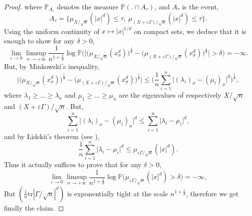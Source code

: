 \documentclass[aop,preprint]{imsart}
\newcommand\PP{\mathbb{P}}
\newcommand\tr{\mathrm{tr}}
\newcommand\eps{\varepsilon}
\numberwithin{equation}{section}
\theoremstyle{definition}
\theoremstyle{plain}
\theoremstyle{remark}
\begin{document}
\begin{proof}
where $\PP_{A_\tau}$ denotes the measure $\PP( . \cap A_\tau)$, and $A_\tau$ is the event,
$$ A_\tau = \big\{ \mu_{X/\sqrt{n}}(|x|^d) \leq \tau, \ \mu_{(X+\eps \Gamma)/\sqrt{n}}(|x|^d) \leq \tau \big\}.$$
Using the uniform continuity of $x\mapsto |x|^{1/d}$ on compact sets, we deduce that it is enough to show for any $\delta>0$,
$$ \lim_{\eps \to 0 } \limsup_{n\to +\infty} \frac{1}{n^{1+\frac{2}{d}}} \log \PP\big( \big|\big(\mu_{X/\sqrt{n}}(x^d_\sigma)\big)^{\frac{1}{d}}- \big(\mu_{(X+\eps \Gamma)/\sqrt{n}}(x^d_\sigma)\big)^{\frac{1}{d}}\big|>\delta \big) = - \infty.$$
But, by Minkowski's inequality, 
$$ \big|\big(\mu_{X/\sqrt{n}}(x^d_\sigma)\big)^{\frac{1}{d}}- \big(\mu_{(X+\eps \Gamma)/\sqrt{n}}(x^d_\sigma)\big)^{\frac{1}{d}} \big| \leq \Big(\frac{1}{n} \sum_{i=1}^n \big|(\lambda_i)_\sigma - (\mu_i)_\sigma \big|^d \Big)^{\frac{1}{d}},$$
where $\lambda_1\geq\ldots\geq \lambda_n$ and $\mu_1\geq \ldots\geq \mu_n$ are the eigenvalues of respectively  $X/\sqrt{n}$ and $(X+\eps \Gamma)/\sqrt{n}$. But,
$$\sum_{i=1}^n \big|(\lambda_i)_\sigma - (\mu_i)_\sigma \big|^d  \leq  \sum_{i=1}^n \big|\lambda_i - \mu_i \big|^d,$$
and  by Lidskii's theorem  (see \cite[Theorem III.4.1]{Bhatia}),
$$ \frac{1}{n}\sum_{i=1}^n \big|\lambda_i - \mu_i \big|^d \leq \mu_{\eps \Gamma/\sqrt{n}}(|x|^d).$$
Thus it actually suffices to prove that for any $\delta > 0$,
$$ \lim_{\eps \to 0 } \limsup_{n\to +\infty} \frac{1}{n^{1+\frac{2}{d}}} \log \PP\big( \mu_{\eps \Gamma/\sqrt{n}}(|x|^d) >\delta \big) = - \infty,$$
But $(\frac{1}{n}\tr|\Gamma/\sqrt{n}|^d)$ is exponentially tight at the scale $n^{1+\frac{2}{d}}$, therefore we get finally the claim.
\end{proof}
\end{document}
